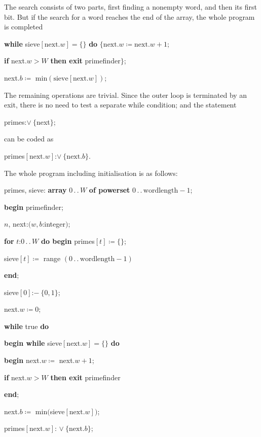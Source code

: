 \documentclass[twoside,11pt]{book}
\begin{document}
The search consists of two parts, first finding a nonempty word, and then its first bit. But if the search for a word reaches the end of the array, the whole program is completed

\quad \textbf{while} sieve$[\text{next}.w] = \{\}$ \textbf{do} $\{\text{next}.w \coloneq \text{next}.w +1$;

\quad \quad \textbf{if} next.$w > W$ \textbf{then exit} primefinder$\}$;

\quad \quad next.$b\coloneq$ min$(\text{sieve}[\text{next}.w])$;

The remaining operations are trivial. Since the outer loop is terminated by an exit, there is no need to test a separate while condition; and the statement

\quad primes:$\vee\ \{$next$\}$;

\noindent
can be coded as

\quad primes$[\text{next}.w]$:$\vee\ \{\text{next}.b\}$.

The whole program including initialisation is as follows:

\quad primes, sieve: \textbf{array} $0\,.\,.\,W$ \textbf{of powerset} $0\,.\,.\,\text{wordlength} - 1$;

\quad \textbf{begin} primefinder;

\quad \quad $n$, next:$(w, b$:integer$)$;

\quad \quad \textbf{for} $t$:$0\,.\,.\,W$ \textbf{do begin} primes$[t] \coloneq \{\}$;

\quad \quad \quad sieve$[t] \coloneq$ range $(0\,.\,.\, \text{wordlength} - 1)$

\quad \quad \textbf{end};

\quad \quad sieve$[0]$:$-\ \{0, 1\}$;

\quad \quad next.$w\coloneq 0$;

\quad \quad \textbf{while} true \textbf{do}

\quad \quad \quad \textbf{begin while} sieve$[\text{next}.w] = \{\}$ \textbf{do}

\quad \quad \quad \quad \textbf{begin} next.$w\coloneq$ next.$w + 1$;

\quad \quad \quad \quad \quad \textbf{if} next.$w > W$ \textbf{then exit} primefinder

\quad \quad \quad \quad \textbf{end};

\quad \quad \quad \quad next.$b\coloneq$ min$($sieve$[\text{next}.w])$;

\quad \quad \quad \quad primes$[\text{next}.w]$: $\vee\ \{\text{next}.b\}$;
\end{document}

